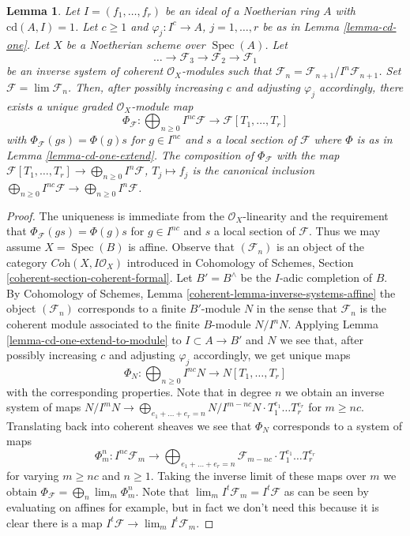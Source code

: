\documentclass{stacks-project}
\theoremstyle{plain}
\newtheorem{lemma}[subsection]{Lemma}
\theoremstyle{definition}
\theoremstyle{remark}
\numberwithin{equation}{subsection}
\def\lim{\mathop{\mathrm{lim}}\nolimits}
\def\Spec{\mathop{\mathrm{Spec}}}
\begin{document}
\begin{lemma}
\label{lemma-cd-is-one-for-system}
Let $I = (f_1, \ldots, f_r)$ be an ideal of a Noetherian ring $A$ with
$\text{cd}(A, I) = 1$. Let $c \geq 1$ and $\varphi_j : I^c \to A$,
$j = 1, \ldots, r$ be as in Lemma \ref{lemma-cd-one}.
Let $X$ be a Noetherian scheme over $\Spec(A)$. Let
$$
\ldots \to \mathcal{F}_3 \to \mathcal{F}_2 \to \mathcal{F}_1
$$
be an inverse system of coherent $\mathcal{O}_X$-modules
such that $\mathcal{F}_n = \mathcal{F}_{n + 1}/I^n\mathcal{F}_{n + 1}$.
Set $\mathcal{F} = \lim \mathcal{F}_n$.
Then, after possibly increasing $c$ and adjusting $\varphi_j$ accordingly,
there exists a unique graded $\mathcal{O}_X$-module map
$$
\Phi_\mathcal{F} :
\bigoplus\nolimits_{n \geq 0} I^{nc}\mathcal{F}
\longrightarrow
\mathcal{F}[T_1, \ldots, T_r]
$$
with $\Phi_\mathcal{F}(g s) = \Phi(g) s$ for $g \in I^{nc}$ and
$s$ a local section of $\mathcal{F}$ where $\Phi$ is as in
Lemma \ref{lemma-cd-one-extend}. The composition of $\Phi_\mathcal{F}$
with the map
$\mathcal{F}[T_1, \ldots, T_r] \to \bigoplus_{n \geq 0} I^n\mathcal{F}$,
$T_j \mapsto f_j$
is the canonical inclusion
$\bigoplus_{n \geq 0} I^{nc}\mathcal{F} \to
\bigoplus_{n \geq 0} I^n\mathcal{F}$.
\end{lemma}

\begin{proof}
The uniqueness is immediate from the $\mathcal{O}_X$-linearity
and the requirement that $\Phi_\mathcal{F}(g s) = \Phi(g) s$ for
$g \in I^{nc}$ and $s$ a local section of $\mathcal{F}$.
Thus we may assume $X = \Spec(B)$ is affine.
Observe that $(\mathcal{F}_n)$ is an object of the category
$\textit{Coh}(X, I\mathcal{O}_X)$ introduced
in Cohomology of Schemes, Section \ref{coherent-section-coherent-formal}.
Let $B' = B^\wedge$ be the $I$-adic completion of $B$.
By Cohomology of Schemes, Lemma \ref{coherent-lemma-inverse-systems-affine}
the object $(\mathcal{F}_n)$ corresponds to a finite $B'$-module $N$
in the sense that $\mathcal{F}_n$ is the coherent
module associated to the finite $B$-module $N/I^n N$.
Applying Lemma \ref{lemma-cd-one-extend-to-module}
to $I \subset A \to B'$ and $N$
we see that, after possibly increasing $c$ and adjusting
$\varphi_j$ accordingly, we get unique maps
$$
\Phi_N : \bigoplus\nolimits_{n \geq 0} I^{nc}N \to N[T_1, \ldots, T_r]
$$
with the corresponding properties. Note that in degree $n$ we obtain
an inverse system of maps $N/I^mN \to \bigoplus_{e_1 + \ldots + e_r = n}
N/I^{m - nc}N \cdot T_1^{e_1} \ldots T_r^{e_r}$ for $m \geq nc$.
Translating back into coherent
sheaves we see that $\Phi_N$ corresponds to a system of maps
$$
\Phi^n_m :
I^{nc}\mathcal{F}_m
\longrightarrow
\bigoplus\nolimits_{e_1 + \ldots + e_r = n}
\mathcal{F}_{m - nc} \cdot T_1^{e_1} \ldots T_r^{e_r}
$$
for varying $m \geq nc$ and $n \geq 1$. Taking the inverse limit of
these maps over $m$ we obtain $\Phi_\mathcal{F} = \bigoplus_n \lim_m \Phi^n_m$.
Note that $\lim_m I^t\mathcal{F}_m = I^t \mathcal{F}$ as can be seen by
evaluating on affines for example, but in fact we don't need this because
it is clear there is a map $I^t\mathcal{F} \to \lim_m I^t\mathcal{F}_m$.
\end{proof}
\end{document}

